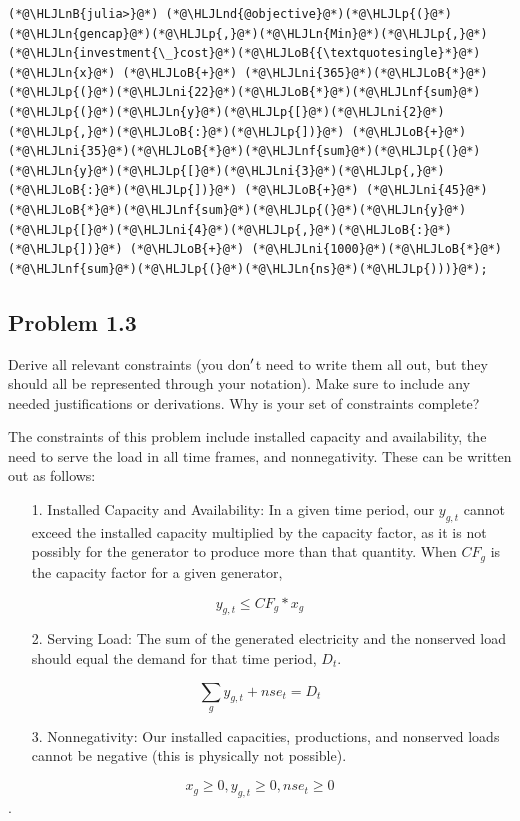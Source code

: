 \documentclass[12pt,a4paper]{article}
\newcommand{\HLJLn}[1]{#1}
\newcommand{\HLJLnd}[1]{\textcolor[RGB]{214,102,97}{#1}}
\newcommand{\HLJLnf}[1]{\textcolor[RGB]{66,102,213}{#1}}
\newcommand{\HLJLnB}[1]{\textcolor[RGB]{59,151,46}{#1}}
\newcommand{\HLJLni}[1]{\textcolor[RGB]{59,151,46}{#1}}
\newcommand{\HLJLoB}[1]{\textcolor[RGB]{102,102,102}{\textbf{#1}}}
\newcommand{\HLJLp}[1]{#1}
\begin{document}
\begin{lstlisting}
(*@\HLJLnB{julia>}@*) (*@\HLJLnd{@objective}@*)(*@\HLJLp{(}@*)(*@\HLJLn{gencap}@*)(*@\HLJLp{,}@*)(*@\HLJLn{Min}@*)(*@\HLJLp{,}@*)(*@\HLJLn{investment{\_}cost}@*)(*@\HLJLoB{{\textquotesingle}*}@*)(*@\HLJLn{x}@*) (*@\HLJLoB{+}@*) (*@\HLJLni{365}@*)(*@\HLJLoB{*}@*)(*@\HLJLp{(}@*)(*@\HLJLni{22}@*)(*@\HLJLoB{*}@*)(*@\HLJLnf{sum}@*)(*@\HLJLp{(}@*)(*@\HLJLn{y}@*)(*@\HLJLp{[}@*)(*@\HLJLni{2}@*)(*@\HLJLp{,}@*)(*@\HLJLoB{:}@*)(*@\HLJLp{])}@*) (*@\HLJLoB{+}@*) (*@\HLJLni{35}@*)(*@\HLJLoB{*}@*)(*@\HLJLnf{sum}@*)(*@\HLJLp{(}@*)(*@\HLJLn{y}@*)(*@\HLJLp{[}@*)(*@\HLJLni{3}@*)(*@\HLJLp{,}@*)(*@\HLJLoB{:}@*)(*@\HLJLp{])}@*) (*@\HLJLoB{+}@*) (*@\HLJLni{45}@*)(*@\HLJLoB{*}@*)(*@\HLJLnf{sum}@*)(*@\HLJLp{(}@*)(*@\HLJLn{y}@*)(*@\HLJLp{[}@*)(*@\HLJLni{4}@*)(*@\HLJLp{,}@*)(*@\HLJLoB{:}@*)(*@\HLJLp{])}@*) (*@\HLJLoB{+}@*) (*@\HLJLni{1000}@*)(*@\HLJLoB{*}@*)(*@\HLJLnf{sum}@*)(*@\HLJLp{(}@*)(*@\HLJLn{ns}@*)(*@\HLJLp{)))}@*);
\end{lstlisting}

\subsection{Problem 1.3}
Derive all relevant constraints (you don\ensuremath{\rq}t need to write them all out, but they should all be represented through your notation).  Make sure to include any needed justifications or derivations. Why is your set of constraints complete?

The constraints of this problem include installed capacity and availability, the need to serve the load  in all time frames, and nonnegativity. These can be written out as follows:

\begin{itemize}
\item[1. ] Installed Capacity and Availability: In a given time period, our $y_{g,t}$ cannot exceed the installed capacity multiplied by the capacity factor, as it is not possibly for the generator to produce more than that quantity. When $CF_g$ is the capacity factor for a given generator,

\end{itemize}
\[
y_{g,t}\ensuremath{\leq}CF_g*x_g
\]
\begin{itemize}
\item[2. ] Serving Load: The sum of the generated electricity and the nonserved load should equal the demand for that time period, $D_t$.

\end{itemize}
\[
\sum_{g} y_{g,t} + nse_t = D_t
\]
\begin{itemize}
\item[3. ] Nonnegativity: Our installed capacities, productions, and nonserved loads cannot be negative (this is physically not possible). 

\end{itemize}
\[
x_g \ensuremath{\geq} 0, y_{g,t} \ensuremath{\geq} 0, nse_t \ensuremath{\geq} 0
\]
.
\end{document}
